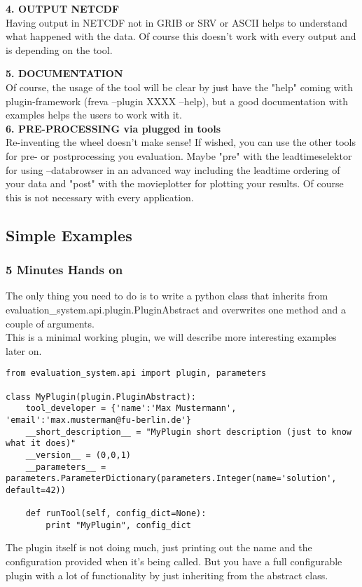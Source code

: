 \documentclass[a4paper,11pt]{ltxdoc}
\begin{document}
\textbf{4. OUTPUT NETCDF}\\
Having output in NETCDF not in GRIB or SRV or ASCII helps to understand what happened with the data. Of course this doesn't work with every output and is depending on the tool.

\textbf{5. DOCUMENTATION}\\
Of course, the usage of the tool will be clear by just have the "help" coming with plugin-framework (freva --plugin XXXX --help), but a good documentation with examples helps the users to work with it.\\

\textbf{6. PRE-PROCESSING via plugged in tools}\\
Re-inventing the wheel doesn't make sense! If wished, you can use the other tools for pre- or postprocessing you evaluation. Maybe "pre" with the leadtimeselektor for using --databrowser in an advanced way including the leadtime ordering of your data and "post" with the movieplotter for plotting your results. Of course this is not necessary with every application.
\subsection{Simple Examples}
\subsubsection{5 Minutes Hands on}
The only thing you need to do is to write a python class that inherits from evaluation\_system.api.plugin.PluginAbstract and overwrites one method and a couple of arguments. \\
This is a minimal working plugin, we will describe more interesting examples later on.\\
\begin{verbatim}
from evaluation_system.api import plugin, parameters

class MyPlugin(plugin.PluginAbstract):
    tool_developer = {'name':'Max Mustermann', 'email':'max.musterman@fu-berlin.de'}
    __short_description__ = "MyPlugin short description (just to know what it does)" 
    __version__ = (0,0,1)
    __parameters__ =  parameters.ParameterDictionary(parameters.Integer(name='solution', default=42))

    def runTool(self, config_dict=None):
        print "MyPlugin", config_dict
\end{verbatim}
The plugin itself is not doing much, just printing out the name and the configuration provided when it's being called.
But you have a full configurable plugin with a lot of functionality by just inheriting from the abstract class.\\
\end{document}
